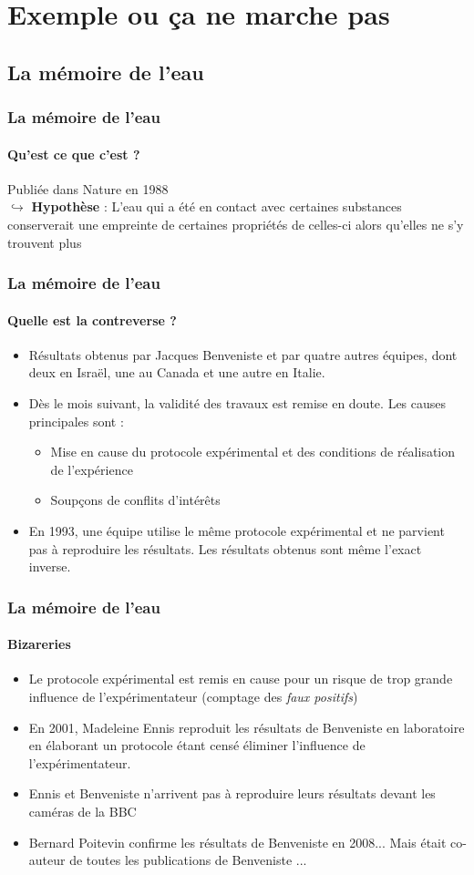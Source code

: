 \documentclass[11pt]{beamer}
\begin{document}
\section{Exemple ou ça ne marche pas}
\subsection{La mémoire de l'eau}
\begin{frame}
\frametitle{La mémoire de l'eau}
\framesubtitle{Qu'est ce que c'est ?}
Publiée dans Nature en 1988
\pause 
\\$\hookrightarrow$ \textbf{Hypothèse} : L’eau qui a été en contact avec certaines substances conserverait une empreinte de certaines propriétés de celles-ci alors qu'elles ne s’y trouvent plus
\pause 
\end{frame}
\begin{frame}
\frametitle{La mémoire de l'eau}
\framesubtitle{Quelle est la contreverse ?}
\begin{itemize}
	\item Résultats obtenus par Jacques  Benveniste et par quatre autres équipes, dont deux en Israël, une au Canada et une autre en Italie. \pause
	\item Dès le mois suivant, la validité des travaux est remise en doute. Les causes principales sont : 
		\begin{itemize}
			\item Mise en cause du protocole expérimental et des conditions de réalisation de l'expérience
			\item Soupçons de conflits d'intérêts
		\end{itemize}  \pause 
	\item En 1993, une équipe utilise le même protocole expérimental et ne parvient pas à reproduire les résultats. Les résultats obtenus sont même l'exact inverse.
\end{itemize}
\end{frame}
\begin{frame}
\frametitle{La mémoire de l'eau}
\framesubtitle{Bizareries}
\begin{itemize}
	\item Le protocole expérimental est remis en cause pour un risque de trop grande influence de l'expérimentateur (comptage des \textit{faux positifs}) \pause 
	\item En 2001, Madeleine Ennis reproduit les résultats de Benveniste en laboratoire en élaborant un protocole étant censé éliminer l'influence de l'expérimentateur. \pause 
	\item Ennis et Benveniste n'arrivent pas à reproduire leurs résultats devant les caméras de la BBC
	\item Bernard Poitevin confirme les résultats de Benveniste en 2008... \pause  Mais était co-auteur de toutes les publications de Benveniste ...
\end{itemize}
\end{frame}
\end{document}

